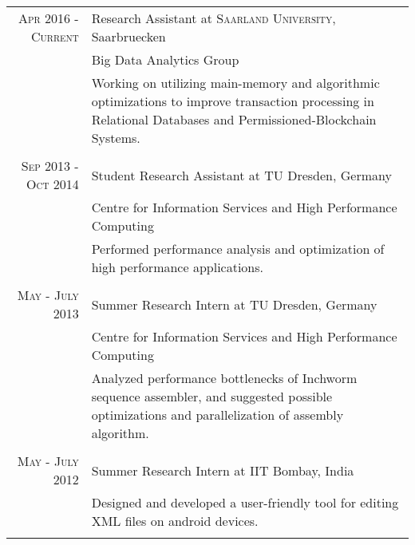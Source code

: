 \documentclass[a4paper,10pt]{article} %
\begin{document}
\begin{tabular}{r|p{11cm}}
\textsc{Apr 2016 - Current} & Research Assistant at \textsc{Saarland University}, Saarbruecken \\
                         & Big Data Analytics Group\\ 
& \footnotesize{Working on utilizing  main-memory and algorithmic optimizations to improve transaction processing in Relational Databases and Permissioned-Blockchain Systems.}\\
\multicolumn{2}{c}{} \\


\textsc{Sep 2013 - Oct 2014} & Student Research Assistant at \textsc{TU} Dresden, Germany \emph{}\\
                         & Centre for Information Services and High Performance Computing\\ 
& \footnotesize{Performed performance analysis and  optimization of high performance applications.}\\
\multicolumn{2}{c}{} \\


\textsc{May - July 2013} & Summer Research Intern at \textsc{TU} Dresden, Germany \emph{}\\
                         & Centre for Information Services and High Performance Computing\\ 
& \footnotesize{Analyzed performance bottlenecks of Inchworm sequence assembler, and suggested possible optimizations and parallelization of assembly algorithm.}\\
\multicolumn{2}{c}{} \\


\textsc{May - July 2012} & Summer Research Intern at \textsc{IIT} Bombay, India \emph{}\\
& \footnotesize{Designed and developed a user-friendly tool for editing XML files on android devices.}\\
\multicolumn{2}{c}{}
\end{tabular}

\end{document}
